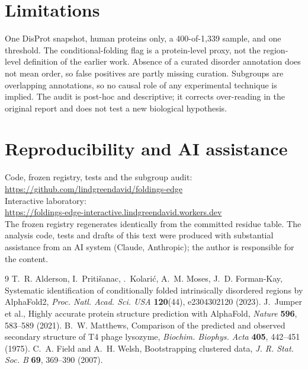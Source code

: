 \documentclass[11pt]{article}
\begin{document}
\section{Limitations}
One DisProt snapshot, human proteins only, a 400-of-1{,}339 sample, and one threshold. The conditional-folding flag is a
protein-level proxy, not the region-level definition of the earlier work. Absence of a curated disorder annotation does
not mean order, so false positives are partly missing curation. Subgroups are overlapping annotations, so no causal
role of any experimental technique is implied. The audit is post-hoc and descriptive; it corrects over-reading in the
original report and does not test a new biological hypothesis.

\section*{Reproducibility and AI assistance}
Code, frozen registry, tests and the subgroup audit:\\
\url{https://github.com/lindgreendavid/foldings-edge}\\
Interactive laboratory:\\
\url{https://foldings-edge-interactive.lindgreendavid.workers.dev}\\
The frozen registry regenerates identically from the committed residue table. The analysis code, tests and drafts of this
text were produced with substantial assistance from an AI system (Claude, Anthropic); the author is responsible for the
content.

\begin{thebibliography}{9}
 T.~R. Alderson, I.~Priti\v{s}anac, {\DJ}.~Kolari\'c, A.~M. Moses, J.~D. Forman-Kay, Systematic
identification of conditionally folded intrinsically disordered regions by AlphaFold2, \emph{Proc. Natl. Acad. Sci. USA}
\textbf{120}(44), e2304302120 (2023).
 J.~Jumper et al., Highly accurate protein structure prediction with AlphaFold,
\emph{Nature} \textbf{596}, 583--589 (2021).
 B.~W. Matthews, Comparison of the predicted and observed secondary structure of T4 phage lysozyme,
\emph{Biochim. Biophys. Acta} \textbf{405}, 442--451 (1975).
 C.~A. Field and A.~H. Welsh, Bootstrapping clustered data,
\emph{J. R. Stat. Soc. B} \textbf{69}, 369--390 (2007).
\end{thebibliography}
\end{document}
